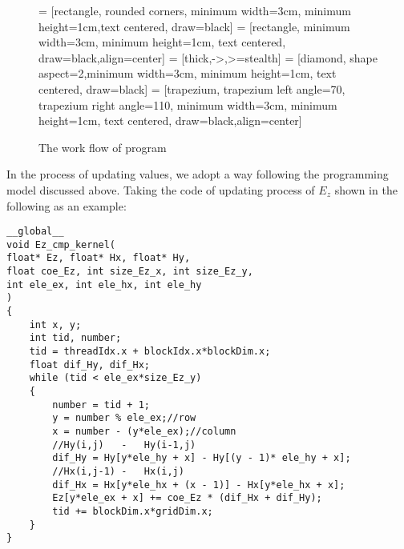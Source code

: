 \begin{figure}[hp]
	\centering
	 = [rectangle, rounded corners, minimum width=3cm, minimum height=1cm,text centered, draw=black]
	 = [rectangle, minimum width=3cm, minimum height=1cm, text centered, draw=black,align=center]
	 = [thick,->,>=stealth]
	 = [diamond, shape aspect=2,minimum width=3cm, minimum height=1cm, text centered, draw=black]
	 = [trapezium, trapezium left angle=70, trapezium right angle=110, minimum width=3cm, minimum height=1cm, text centered, draw=black,align=center]
	\caption{The work flow of program}
	\label{ch4: workflow}
\end{figure}

In the process of updating values, we adopt a way following the programming model discussed above. Taking the code of updating process of $E_z$ shown in the following as an example:
\begin{lstlisting}
__global__
void Ez_cmp_kernel(
float* Ez, float* Hx, float* Hy,
float coe_Ez, int size_Ez_x, int size_Ez_y,
int ele_ex, int ele_hx, int ele_hy
)
{
	int x, y;
	int tid, number;
	tid = threadIdx.x + blockIdx.x*blockDim.x;
	float dif_Hy, dif_Hx;
	while (tid < ele_ex*size_Ez_y)
	{
		number = tid + 1;
		y = number % ele_ex;//row
		x = number - (y*ele_ex);//column
		//Hy(i,j)	-	Hy(i-1,j)
		dif_Hy = Hy[y*ele_hy + x] - Hy[(y - 1)* ele_hy + x];
		//Hx(i,j-1)	-	Hx(i,j)
		dif_Hx = Hx[y*ele_hx + (x - 1)] - Hx[y*ele_hx + x];
		Ez[y*ele_ex + x] += coe_Ez * (dif_Hx + dif_Hy);
		tid += blockDim.x*gridDim.x;
	}
}
\end{lstlisting}

